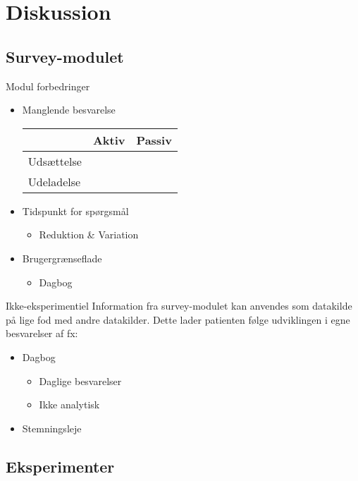 \section{Diskussion}
\subsection{Survey-modulet}
\begin{frame}{Modul forbedringer}
\begin{itemize}
\item Manglende besvarelse\\
\begin{tabular}{|l|l|l|}\cline{2-3}
\multicolumn{1}{l|}{} & Aktiv & Passiv\\\hline
Udsættelse & & \\\hline
Udeladelse & & \\\hline
\end{tabular}
\end{itemize}
\begin{itemize}
\item Tidspunkt for spørgsmål
\begin{itemize}
\item Reduktion \& Variation
\end{itemize}
\item Brugergrænseflade
\begin{itemize}
\item Dagbog
\end{itemize}
\end{itemize}
\end{frame}

\begin{frame}{Ikke-eksperimentiel}
Information fra survey-modulet kan anvendes som datakilde på lige fod med andre datakilder.
Dette lader patienten følge udviklingen i egne besvarelser af fx:
\begin{itemize}
\pause
\item Dagbog
\begin{itemize}
\item Daglige besvarelser
\item Ikke analytisk
\end{itemize}
\pause
\item Stemningsleje\\

\end{itemize}
\end{frame}

\subsection{Eksperimenter}


